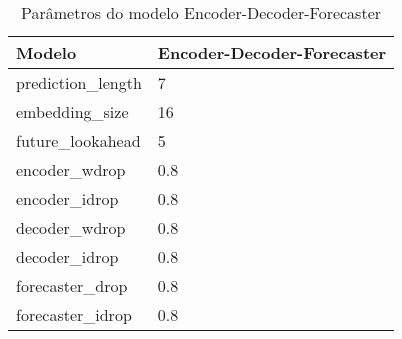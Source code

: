 \begin{center}
\begin{table}[] 
\begin{tabular}{|l|l|} 
\hline
Modelo             & Encoder-Decoder-Forecaster \\ \hline
prediction\_length & 7        \\ \hline
embedding\_size & 16 \\ \hline
future\_lookahead & 5 \\ \hline
encoder\_wdrop & 0.8 \\ \hline
encoder\_idrop & 0.8 \\ \hline
decoder\_wdrop & 0.8 \\ \hline
decoder\_idrop & 0.8 \\ \hline
forecaster\_drop & 0.8 \\ \hline
forecaster\_idrop & 0.8 \\ \hline
\end{tabular}
\caption{Parâmetros do modelo Encoder-Decoder-Forecaster}
\end{table}
\end{center}
